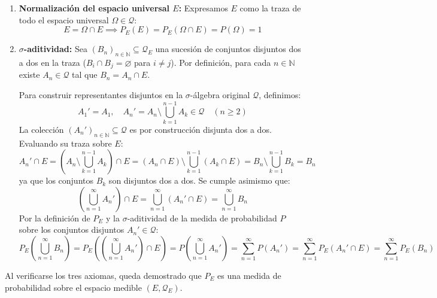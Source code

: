 \begin{problema}
\begin{enumerate}[label=\arabic*.]
    \item \textbf{Normalización del espacio universal $E$:}
    Expresamos $E$ como la traza de todo el espacio universal $\Omega \in \mathcal{Q}$:
    \[
        E = \Omega \cap E \implies P_E(E) = P_E(\Omega \cap E) = P(\Omega) = 1
    \]

    \item \textbf{$\sigma$-aditividad:}
    Sea $(B_n)_{n \in \mathbb{N}} \subseteq \mathcal{Q}_E$ una sucesión de conjuntos disjuntos dos a dos en la traza ($B_i \cap B_j = \varnothing$ para $i \neq j$). Por definición, para cada $n \in \mathbb{N}$ existe $A_n \in \mathcal{Q}$ tal que $B_n = A_n \cap E$.

    Para construir representantes disjuntos en la $\sigma$-álgebra original $\mathcal{Q}$, definimos:
    \[
        A_1' = A_1, \quad A_n' = A_n \setminus \bigcup_{k=1}^{n-1} A_k \in \mathcal{Q} \quad (n \ge 2)
    \]
    La colección $(A_n')_{n \in \mathbb{N}} \subseteq \mathcal{Q}$ es por construcción disjunta dos a dos. Evaluando su traza sobre $E$:
    \[
        A_n' \cap E = \left( A_n \setminus \bigcup_{k=1}^{n-1} A_k \right) \cap E = (A_n \cap E) \setminus \bigcup_{k=1}^{n-1} (A_k \cap E) = B_n \setminus \bigcup_{k=1}^{n-1} B_k = B_n
    \]
    ya que los conjuntos $B_k$ son disjuntos dos a dos. Se cumple asimismo que:
    \[
        \left( \bigcup_{n=1}^\infty A_n' \right) \cap E = \bigcup_{n=1}^\infty (A_n' \cap E) = \bigcup_{n=1}^\infty B_n
    \]
    Por la definición de $P_E$ y la $\sigma$-aditividad de la medida de probabilidad $P$ sobre los conjuntos disjuntos $A_n' \in \mathcal{Q}$:
    \[
        P_E\left( \bigcup_{n=1}^\infty B_n \right) = P_E\left( \left(\bigcup_{n=1}^\infty A_n'\right) \cap E \right) = P\left( \bigcup_{n=1}^\infty A_n' \right) = \sum_{n=1}^\infty P(A_n') = \sum_{n=1}^\infty P_E(A_n' \cap E) = \sum_{n=1}^\infty P_E(B_n)
    \]
\end{enumerate}

Al verificarse los tres axiomas, queda demostrado que $P_E$ es una medida de probabilidad sobre el espacio medible $(E, \mathcal{Q}_E)$.
\end{problema}

\newpage

